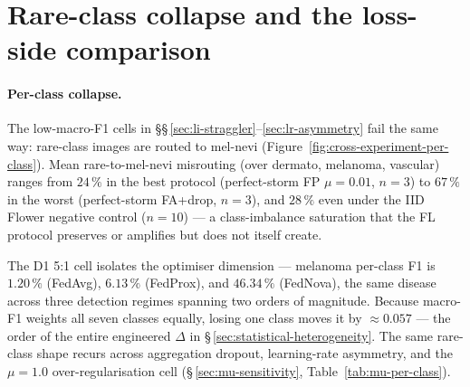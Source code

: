 \documentclass[11pt,a4paper]{report}
\begin{document}


\section{Rare-class collapse and the loss-side comparison}
\label{sec:rare-class-collapse}


\paragraph{Per-class collapse.}

The low-macro-F1 cells in \S\S\,\ref{sec:li-straggler}--\ref{sec:lr-asymmetry}
fail the same way: rare-class images are routed to mel-nevi
(Figure~\ref{fig:cross-experiment-per-class}). Mean rare-to-mel-nevi
misrouting (over dermato, melanoma, vascular) ranges from $24\,\%$ in the
best protocol (perfect-storm FP $\mu = 0.01$, $n=3$) to $67\,\%$ in the
worst (perfect-storm FA+drop, $n=3$), and $28\,\%$ even under the IID
Flower negative control ($n=10$) --- a class-imbalance saturation that the
FL protocol preserves or amplifies but does not itself create.

The D1 5:1 cell isolates the optimiser dimension --- melanoma per-class F1 is
$1.20\,\%$ (FedAvg), $6.13\,\%$ (FedProx), and $46.34\,\%$ (FedNova), the same
disease across three detection regimes spanning two orders of magnitude. Because
macro-F1 weights all seven classes equally, losing one class moves it by
$\approx 0.057$ --- the order of the entire engineered $\Delta$ in
\S\,\ref{sec:statistical-heterogeneity}. The same rare-class shape recurs across
aggregation dropout, learning-rate asymmetry, and the $\mu = 1.0$
over-regularisation cell (\S\,\ref{sec:mu-sensitivity}, Table~\ref{tab:mu-per-class}).
\end{document}
